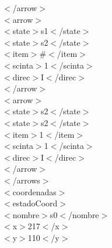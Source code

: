 \documentclass[12pt,a4paper,spanish]{book}
\begin{document}
{\indent \indent $<$/arrow$>$\\

\indent \indent $<$arrow$>$\\

\indent \indent \indent $<$state$>$s1$<$/state$>$\\

\indent \indent \indent $<$state$>$s2$<$/state$>$\\

\indent \indent \indent $<$item$>$\#$<$/item$>$\\

\indent \indent \indent $<$scinta$>$1$<$/scinta$>$\\

\indent \indent \indent $<$direc$>$I$<$/direc$>$\\

\indent \indent $<$/arrow$>$\\

\indent \indent $<$arrow$>$\\

\indent \indent \indent $<$state$>$s2$<$/state$>$\\

\indent \indent \indent $<$state$>$s2$<$/state$>$\\

\indent \indent \indent $<$item$>$1$<$/item$>$\\

\indent \indent \indent $<$scinta$>$1$<$/scinta$>$\\

\indent \indent \indent $<$direc$>$I$<$/direc$>$\\

\indent \indent $<$/arrow$>$\\

\indent $<$/arrows$>$\\

\indent $<$coordenadas$>$\\

\indent \indent $<$estadoCoord$>$\\

\indent \indent \indent $<$nombre$>$s0$<$/nombre$>$\\

\indent \indent \indent $<$x$>$217$<$/x$>$\\

\indent \indent \indent $<$y$>$110$<$/y$>$\\

}
\end{document}
